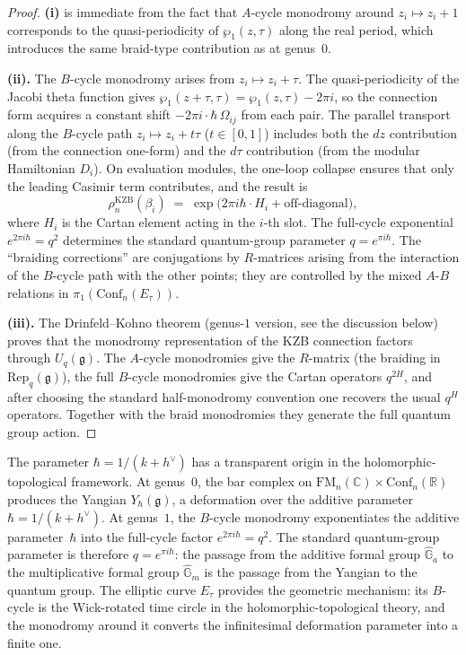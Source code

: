 \begin{proof}
\textbf{(i)} is immediate from the fact that $A$-cycle monodromy around
$z_i \mapsto z_i + 1$ corresponds to the quasi-periodicity of
$\wp_1(z,\tau)$ along the real period, which introduces the same
braid-type contribution as at genus~$0$.

\medskip
\noindent\textbf{(ii).}
The $B$-cycle monodromy arises from $z_i \mapsto z_i + \tau$. The
quasi-periodicity of the Jacobi theta function gives
$\wp_1(z + \tau, \tau) = \wp_1(z, \tau) - 2\pi i$, so the connection
form acquires a constant shift $-2\pi i \cdot \hbar\,\Omega_{ij}$
from each pair. The parallel transport along the
$B$-cycle path $z_i \mapsto z_i + t\tau$ ($t \in [0,1]$) includes
both the $dz$ contribution (from the connection one-form) and the
$d\tau$ contribution (from the modular Hamiltonian $D_i$). On
evaluation modules, the one-loop collapse ensures that only the
leading Casimir term contributes, and the result is
\[
\rho_n^{\mathrm{KZB}}(\beta_i)
\;=\;
\exp\bigl(2\pi i \hbar \cdot H_i + \text{off-diagonal}\bigr),
\]
where $H_i$ is the Cartan element acting in the $i$-th slot. The
full-cycle exponential $e^{2\pi i \hbar} = q^2$ determines the
standard quantum-group parameter $q = e^{\pi i\hbar}$. The
``braiding corrections'' are conjugations by
$R$-matrices arising from the interaction of the $B$-cycle path with
the other points; they are controlled by the mixed $A$-$B$ relations
in $\pi_1(\mathrm{Conf}_n(E_\tau))$.

\medskip
\noindent\textbf{(iii).}
The Drinfeld--Kohno theorem (genus-$1$ version, see the discussion
below) proves that the monodromy representation of the KZB connection
factors through $U_q(\mathfrak{g})$. The $A$-cycle monodromies give
the $R$-matrix (the braiding in $\mathrm{Rep}_q(\mathfrak{g})$),
the full $B$-cycle monodromies give the Cartan operators $q^{2H}$,
and after choosing the standard half-monodromy convention one recovers
the usual $q^H$ operators. Together with the braid monodromies they
generate the full quantum group action.
\end{proof}

\begin{remark}
\label{rem:q-physical}
The parameter $\hbar = 1/(k+h^\vee)$
has a transparent origin in the holomorphic-topological framework.
At genus~$0$, the bar complex on $\mathrm{FM}_n(\mathbb{C}) \times
\mathrm{Conf}_n(\mathbb{R})$ produces the Yangian $Y_\hbar(\mathfrak{g})$,
a deformation over the additive parameter $\hbar = 1/(k + h^\vee)$.
At genus~$1$, the $B$-cycle monodromy exponentiates the additive
parameter~$\hbar$ into the full-cycle factor $e^{2\pi i\hbar}=q^2$.
The standard quantum-group parameter is therefore
$q = e^{\pi i \hbar}$: the passage from the additive formal group
$\widehat{\mathbb{G}}_a$ to the multiplicative formal group
$\widehat{\mathbb{G}}_m$ is the passage from the Yangian to the
quantum group. The elliptic curve $E_\tau$ provides the geometric
mechanism: its $B$-cycle is the Wick-rotated time circle in the
holomorphic-topological theory, and the monodromy around it converts
the infinitesimal deformation parameter into a finite one.
\end{remark}

